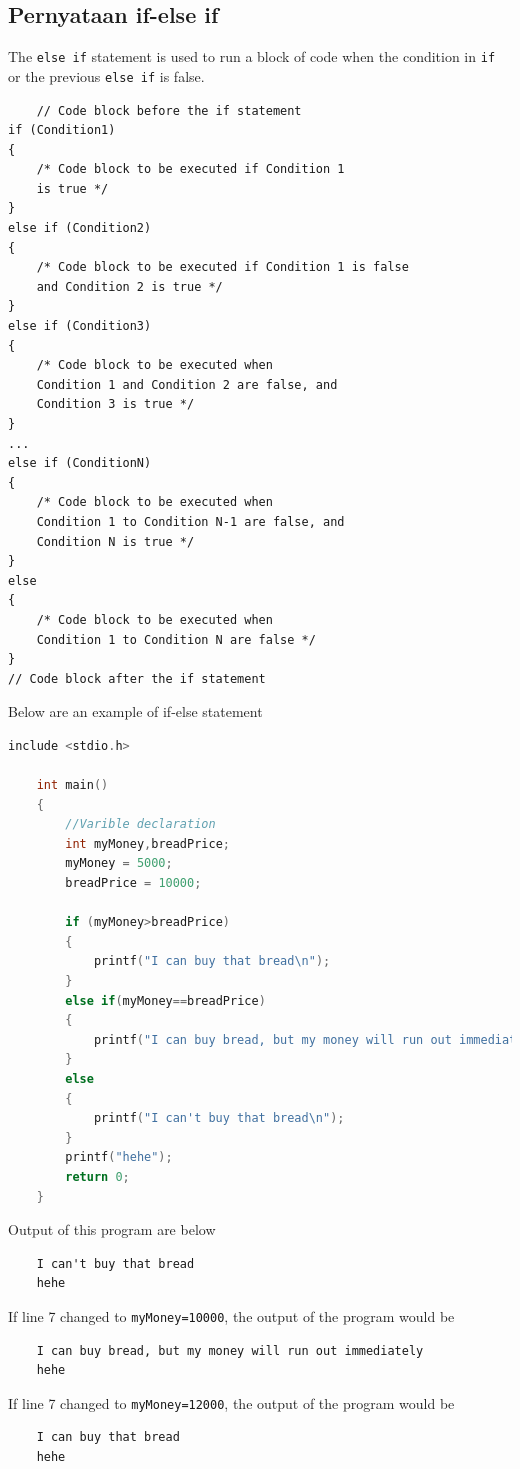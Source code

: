 \subsection{Pernyataan if-else if}
The \verb|else if| statement is used to run a block of code when the condition in \verb|if| or the previous \verb|else if| is false.
\begin{verbatim}
	// Code block before the if statement
if (Condition1)
{
    /* Code block to be executed if Condition 1
    is true */
}
else if (Condition2)
{
    /* Code block to be executed if Condition 1 is false
    and Condition 2 is true */
}
else if (Condition3)
{
    /* Code block to be executed when
    Condition 1 and Condition 2 are false, and
    Condition 3 is true */
}
...
else if (ConditionN)
{
    /* Code block to be executed when
    Condition 1 to Condition N-1 are false, and
    Condition N is true */
}
else
{
    /* Code block to be executed when
    Condition 1 to Condition N are false */
}
// Code block after the if statement
\end{verbatim}
Below are an example of if-else statement
\begin{lstlisting}[language=c,caption = If-else example if,label=lst:ifelseifexample01]
	include <stdio.h>
	
	int main()
	{
		//Varible declaration
		int myMoney,breadPrice;
		myMoney = 5000;
		breadPrice = 10000;
		
		if (myMoney>breadPrice)
		{
		    printf("I can buy that bread\n");
		}
		else if(myMoney==breadPrice)
		{
		    printf("I can buy bread, but my money will run out immediately");
		}
		else
		{
	        printf("I can't buy that bread\n");	
		}
		printf("hehe");
		return 0;
	}
\end{lstlisting}                        
Output of this program are below
\begin{verbatim}
    I can't buy that bread
    hehe
\end{verbatim}
If line 7 changed to \verb|myMoney=10000|, the output of the program would be
\begin{verbatim}
    I can buy bread, but my money will run out immediately
    hehe
\end{verbatim}
If line 7 changed to \verb|myMoney=12000|, the output of the program would be
\begin{verbatim}
    I can buy that bread
    hehe
\end{verbatim}

